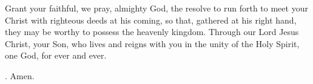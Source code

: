 \lettrine[lines=3]{G}{}rant your faithful, we pray, almighty God, the resolve to run forth to meet your Christ with righteous deeds at his coming, so that, gathered at his right hand, they may be worthy to possess the heavenly kingdom. Through our Lord Jesus Christ, your Son, who lives and reigns with you in the unity of the Holy Spirit, one God, for ever and ever. \par \Rbar. Amen.
